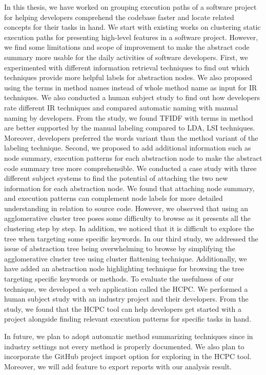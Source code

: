 \label{chapter:conclusion}
In this thesis, we have worked on grouping execution paths of a software project for helping developers comprehend the codebase faster and locate related concepts for their tasks in hand. We start with existing works on clustering static execution paths for presenting high-level features in a software project. However, we find some limitations and scope of improvement to make the abstract code summary more usable for the daily activities of software developers. First, we experimented with different information retrieval techniques to find out which techniques provide more helpful labels for abstraction nodes. We also proposed using the terms in method names instead of whole method name as input for IR techniques. We also conducted a human subject study to find out how developers rate different IR techniques and compared automatic naming with manual naming by developers. From the study, we found TFIDF with terms in method are better supported by the manual labeling compared to LDA, LSI techniques. Moreover, developers preferred the words variant than the method variant of the labeling technique. Second, we proposed to add additional information such as node summary, execution patterns for each abstraction node to make the abstract code summary tree more comprehensible. We conducted a case study with three different subject systems to find the potential of attaching the two new information for each abstraction node. We found that attaching node summary, and execution patterns can complement node labels for more detailed understanding in relation to source code. However, we observed that using an agglomerative cluster tree poses some difficulty to browse as it presents all the clustering step by step. In addition, we noticed that it is difficult to explore the tree when targeting some specific keywords. In our third study, we addressed the issue of abstraction tree being overwhelming to browse by simplifying the agglomerative cluster tree using cluster flattening technique. Additionally, we have added an abstraction node highlighting technique for browsing the tree targeting specific keywords or methods. To evaluate the usefulness of our technique, we developed a web application called the HCPC. We performed a human subject study with an industry project and their developers. From the study, we found that the HCPC tool can help developers get started with a project alongside finding relevant execution patterns for specific tasks in hand.

In future, we plan to adopt automatic method summarizing techniques since in industry settings not every method is properly documented. We also plan to incorporate the GitHub project import option for exploring in the HCPC tool. Moreover, we will add feature to export reports with our analysis result.